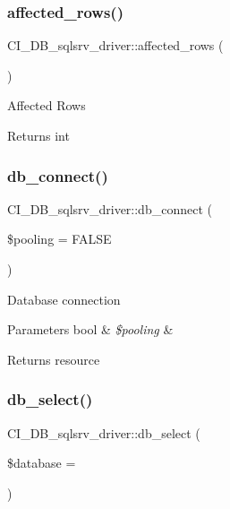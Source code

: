 \subsubsection{\texorpdfstring{affected\+\_\+rows()}{affected\_rows()}}
{\footnotesize\ttfamily C\+I\+\_\+\+D\+B\+\_\+sqlsrv\+\_\+driver\+::affected\+\_\+rows (\begin{DoxyParamCaption}{ }\end{DoxyParamCaption})}

Affected Rows

\begin{DoxyReturn}{Returns}
int 
\end{DoxyReturn}
\mbox{\label{class_c_i___d_b__sqlsrv__driver_a9930c6204361c4e4851423c30617b7c0}} 
\subsubsection{\texorpdfstring{db\+\_\+connect()}{db\_connect()}}
{\footnotesize\ttfamily C\+I\+\_\+\+D\+B\+\_\+sqlsrv\+\_\+driver\+::db\+\_\+connect (\begin{DoxyParamCaption}\item[{}]{\$pooling = {\ttfamily FALSE} }\end{DoxyParamCaption})}

Database connection


\begin{DoxyParams}[1]{Parameters}
bool & {\em \$pooling} & \\
\hline
\end{DoxyParams}
\begin{DoxyReturn}{Returns}
resource 
\end{DoxyReturn}
\mbox{\label{class_c_i___d_b__sqlsrv__driver_a067dd6e940da224074a198a3f6396c61}} 
\subsubsection{\texorpdfstring{db\+\_\+select()}{db\_select()}}
{\footnotesize\ttfamily C\+I\+\_\+\+D\+B\+\_\+sqlsrv\+\_\+driver\+::db\+\_\+select (\begin{DoxyParamCaption}\item[{}]{\$database = {\ttfamily \textquotesingle{}\textquotesingle{}} }\end{DoxyParamCaption})}

